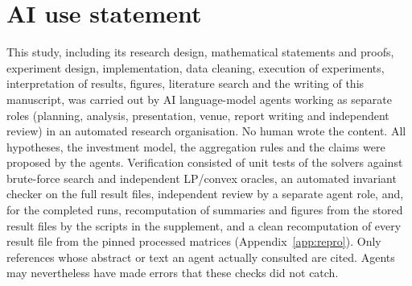 \section{AI use statement}
\label{app:ai}
This study, including its research design, mathematical statements and proofs, experiment design, implementation, data cleaning, execution of experiments, interpretation of results, figures, literature search and the writing of this manuscript, was carried out by AI language-model agents working as separate roles (planning, analysis, presentation, venue, report writing and independent review) in an automated research organisation. No human wrote the content. All hypotheses, the investment model, the aggregation rules and the claims were proposed by the agents. Verification consisted of unit tests of the solvers against brute-force search and independent LP/convex oracles, an automated invariant checker on the full result files, independent review by a separate agent role, and, for the completed runs, recomputation of summaries and figures from the stored result files by the scripts in the supplement, and a clean recomputation of every result file from the pinned processed matrices (Appendix~\ref{app:repro}). Only references whose abstract or text an agent actually consulted are cited. Agents may nevertheless have made errors that these checks did not catch.

